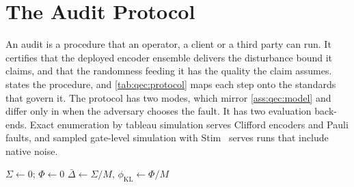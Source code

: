 \section{The Audit Protocol}\label{sec:qec:protocol}

An audit is a procedure that an operator, a client or a third party can run. It certifies that the deployed encoder ensemble delivers the disturbance bound it claims, and that the randomness feeding it has the quality the claim assumes.  states the procedure, and \cref{tab:qec:protocol} maps each step onto the standards that govern it. The protocol has two modes, which mirror \cref{ass:qec:model} and differ only in when the adversary chooses the fault. It has two evaluation back-ends. Exact enumeration by tableau simulation serves Clifford encoders and Pauli faults, and sampled gate-level simulation with Stim~\cite{gidney2021stim} serves runs that include native noise.

\begin{algorithm}[htbp]
\caption{Randomness audit of a seeded QEC encoder under the bounded cloud fault model.}
\label{alg:qec:audit}
$\Sigma\leftarrow 0$; $\Phi\leftarrow 0$\;
\Return $\bar\Delta\leftarrow\Sigma/M$, $\phi_{\mathrm{KL}}\leftarrow\Phi/M$\;
\end{algorithm}

